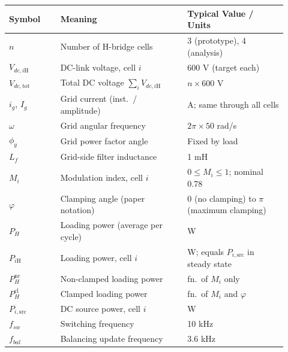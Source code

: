 \documentclass[12pt, a4paper]{article}
\def\,{ }%
\newcommand{\ig}{i_{g}}
\newcommand{\Ig}{I_{g}}
\newcommand{\omg}{\omega}
\newcommand{\phig}{\phi_{g}}
\newcommand{\Vdci}[1]{V_{dc,#1\mathrm{H}}}
\newcommand{\Vtot}{V_{dc,\mathrm{tot}}}
\newcommand{\Mi}{M_{i}}
\newcommand{\phic}{\varphi}
\newcommand{\PH}{P_{H}}
\newcommand{\PHi}[1]{P_{#1\mathrm{H}}}
\newcommand{\PHnc}{P_{H}^{\mathrm{nc}}}
\newcommand{\PHcl}{P_{H}^{\mathrm{cl}}}
\begin{document}
\begin{statebox}
\renewcommand{\arraystretch}{1.3}
\begin{tabular}{p{0.17\linewidth} p{0.42\linewidth} p{0.33\linewidth}}
\toprule
\textbf{Symbol} & \textbf{Meaning} & \textbf{Typical Value / Units} \\
\midrule
$n$                    & Number of H-bridge cells            & 3 (prototype), 4 (analysis) \\
$\Vdci{i}$            & DC-link voltage, cell $i$           & 600\,V (target each) \\
$\Vtot$                & Total DC voltage $\sum_i \Vdci{i}$ & $n \times 600$\,V \\
$\ig$, $\Ig$          & Grid current (inst.\ / amplitude)   & A; same through all cells \\
$\omg$                 & Grid angular frequency              & $2\pi \times 50$\,rad/s \\
$\phig$                & Grid power factor angle             & Fixed by load \\
$L_f$                  & Grid-side filter inductance         & 1\,mH \\
$\Mi$                  & Modulation index, cell $i$          & $0 \leq M_i \leq 1$; nominal 0.78 \\
$\phic$                & Clamping angle (paper notation)     & 0 (no clamping) to $\pi$ (maximum clamping) \\
$\PH$                  & Loading power (average per cycle)   & W \\
$\PHi{i}$             & Loading power, cell $i$             & W; equals $P_{i,\mathrm{src}}$ in steady state \\
$\PHnc$                & Non-clamped loading power           & fn.\ of $\Mi$ only \\
$\PHcl$                & Clamped loading power               & fn.\ of $\Mi$ and $\phic$ \\
$P_{i,\mathrm{src}}$  & DC source power, cell $i$           & W \\
$f_{sw}$               & Switching frequency                 & 10\,kHz \\
$f_{bal}$              & Balancing update frequency          & 3.6\,kHz \\
\bottomrule
\end{tabular}
\end{statebox}

\clearpage

\end{document}
